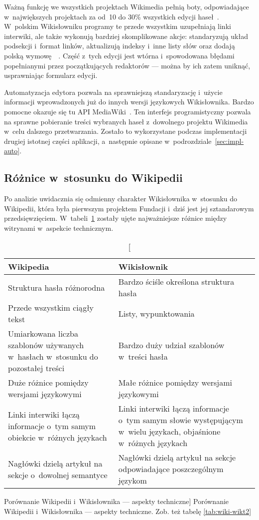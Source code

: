 Ważną funkcję we wszystkich projektach Wikimedia pełnią boty, odpowiadające w~największych projektach za od~10 do 30\% wszystkich edycji haseł~\cite{bots}. W~polskim Wikisłowniku programy te przede wszystkim uzupełniają linki interwiki, ale także wykonują bardziej skomplikowane akcje: standaryzują układ podsekcji i~format linków, aktualizują indeksy i~inne listy słów oraz dodają polską wymowę~\cite{wikt:boty}~\cite{wikt:olafbot}. Część z~tych edycji jest wtórna i~spowodowana błędami popełnianymi przez początkujących redaktorów --- można by ich zatem uniknąć, usprawniając formularz edycji.

Automatyzacja edytora pozwala na sprawniejszą standaryzację i~użycie informacji wprowadzonych już do innych wersji językowych Wikisłownika. Bardzo pomocne okazuje się tu API MediaWiki~\cite{mw:api}. Ten interfejs programistyczny pozwala na sprawne pobieranie treści wybranych haseł z~dowolnego projektu Wikimedia w~celu dalszego przetwarzania. Zostało to wykorzystane podczas implementacji drugiej istotnej części aplikacji, a~następnie opisane w~podrozdziale~\ref{sec:impl-auto}.


\subsection{Różnice w~stosunku do Wikipedii}
\label{subs:wiki-wikt}
Po analizie uwidacznia się odmienny charakter Wikisłownika w~stosunku do Wikipedii, która była pierwszym projektem Fundacji i~dziś jest jej sztandarowym przedsięwzięciem. W~tabeli~\ref{tab:wiki-wikt} zostały ujęte najważniejsze różnice między witrynami w~aspekcie technicznym.
\begin{table}[h]
\begin{center}
	\begin{tabularx}{\textwidth}{ XX }
		\toprule \textbf{Wikipedia} & \textbf{Wikisłownik} \\
		\toprule Struktura hasła różnorodna
			& Bardzo ściśle określona struktura hasła \\
		\midrule Przede wszystkim ciągły tekst
			& Listy, wypunktowania \\
		\midrule Umiarkowana liczba szablonów używanych w~hasłach w~stosunku do pozostałej treści
			& Bardzo duży udział szablonów w~treści hasła \\
		\midrule Duże różnice pomiędzy wersjami językowymi
			& Małe różnice pomiędzy wersjami językowymi \\
		\midrule Linki interwiki łączą informacje o~tym samym obiekcie w~różnych językach
			& Linki interwiki łączą informacje o~tym samym słowie występującym w~wielu językach, objaśnione w~różnych językach \\
		\midrule Nagłówki dzielą artykuł na sekcje o~dowolnej semantyce
			& Nagłówki dzielą artykuł na sekcje odpowiadające poszczególnym językom \\
		\bottomrule
	\end{tabularx}
\caption
	[Porównanie Wikipedii i~Wikisłownika --- aspekty techniczne]
	{Porównanie Wikipedii i~Wikisłownika --- aspekty techniczne. Zob. też tabelę \ref{tab:wiki-wikt2}}
\label{tab:wiki-wikt}
\end{center}
\end{table}

